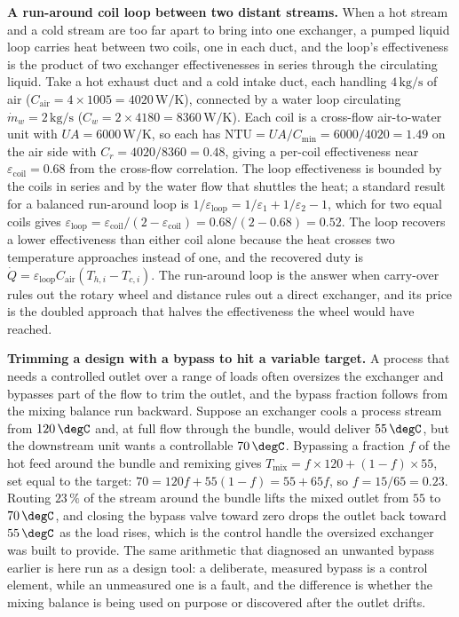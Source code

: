 \textbf{A run-around coil loop between two distant streams.} When a hot stream and
a cold stream are too far apart to bring into one exchanger, a pumped liquid loop
carries heat between two coils, one in each duct, and the loop's effectiveness is
the product of two exchanger effectivenesses in series through the circulating
liquid. Take a hot exhaust duct and a cold intake duct, each handling $4\,\text{kg/s}$
of air ($C_{\text{air}} = 4\times 1005 = 4020\,\si{\watt\per\kelvin}$), connected by
a water loop circulating $\dot{m}_w = 2\,\text{kg/s}$ ($C_w = 2\times 4180 =
8360\,\si{\watt\per\kelvin}$). Each coil is a cross-flow air-to-water unit with
$UA = 6000\,\text{W}/\si{\kelvin}$, so each has $\text{NTU} = UA/C_{\min} =
6000/4020 = 1.49$ on the air side with $C_r = 4020/8360 = 0.48$, giving a per-coil
effectiveness near $\varepsilon_{\text{coil}} = 0.68$ from the cross-flow
correlation. The loop effectiveness is bounded by the coils in series and by the
water flow that shuttles the heat; a standard result for a balanced run-around loop
is $1/\varepsilon_{\text{loop}} = 1/\varepsilon_1 + 1/\varepsilon_2 - 1$, which for
two equal coils gives $\varepsilon_{\text{loop}} = \varepsilon_{\text{coil}}/
(2 - \varepsilon_{\text{coil}}) = 0.68/(2 - 0.68) = 0.52$. The loop recovers a
lower effectiveness than either coil alone because the heat crosses two
temperature approaches instead of one, and the recovered duty is $\dot{Q} =
\varepsilon_{\text{loop}} C_{\text{air}}(T_{h,i} - T_{c,i})$. The run-around loop
is the answer when carry-over rules out the rotary wheel and distance rules out a
direct exchanger, and its price is the doubled approach that halves the
effectiveness the wheel would have reached.

\textbf{Trimming a design with a bypass to hit a variable target.} A process that
needs a controlled outlet over a range of loads often oversizes the exchanger and
bypasses part of the flow to trim the outlet, and the bypass fraction follows from
the mixing balance run backward. Suppose an exchanger cools a process stream from
$120\,\degC$ and, at full flow through the bundle, would deliver $55\,\degC$, but
the downstream unit wants a controllable $70\,\degC$. Bypassing a fraction $f$ of
the hot feed around the bundle and remixing gives $T_{\text{mix}} = f\times 120 +
(1 - f)\times 55$, set equal to the target: $70 = 120 f + 55(1 - f) = 55 + 65 f$,
so $f = 15/65 = 0.23$. Routing $23\,\%$ of the stream around the bundle lifts the
mixed outlet from $55$ to $70\,\degC$, and closing the bypass valve toward zero
drops the outlet back toward $55\,\degC$ as the load rises, which is the control
handle the oversized exchanger was built to provide. The same arithmetic that
diagnosed an unwanted bypass earlier is here run as a design tool: a deliberate,
measured bypass is a control element, while an unmeasured one is a fault, and the
difference is whether the mixing balance is being used on purpose or discovered
after the outlet drifts.

